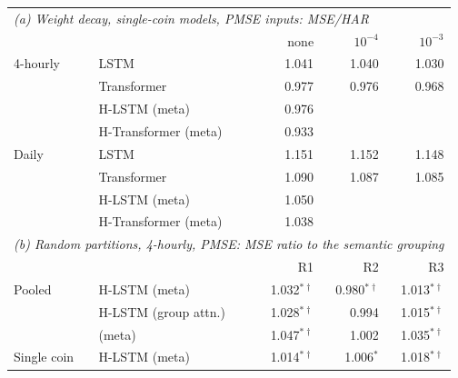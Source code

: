 \begin{tabular}{llrrr}
\toprule
\multicolumn{5}{l}{\emph{(a) Weight decay, single-coin models, PMSE inputs: MSE/HAR}} \\
 & & none & $10^{-4}$ & $10^{-3}$ \\
\midrule
4-hourly & LSTM & 1.041 & 1.040 & 1.030 \\
 & Transformer & 0.977 & 0.976 & 0.968 \\
 & H-LSTM (meta) & 0.976 &  &  \\
 & H-Transformer (meta) & 0.933 &  &  \\
Daily & LSTM & 1.151 & 1.152 & 1.148 \\
 & Transformer & 1.090 & 1.087 & 1.085 \\
 & H-LSTM (meta) & 1.050 &  &  \\
 & H-Transformer (meta) & 1.038 &  &  \\
\midrule
\multicolumn{5}{l}{\emph{(b) Random partitions, 4-hourly, PMSE: MSE ratio to the semantic grouping}} \\
 & & R1 & R2 & R3 \\
\midrule
Pooled & H-LSTM (meta) & 1.032$^{*\dagger}$ & 0.980$^{*\dagger}$ & 1.013$^{*\dagger}$ \\
 & H-LSTM (group attn.) & 1.028$^{*\dagger}$ & 0.994 & 1.015$^{*\dagger}$ \\
 & \HQ{} (meta) & 1.047$^{*\dagger}$ & 1.002 & 1.035$^{*\dagger}$ \\
Single coin & H-LSTM (meta) & 1.014$^{*\dagger}$ & 1.006$^{*}$ & 1.018$^{*\dagger}$ \\
\bottomrule
\end{tabular}
